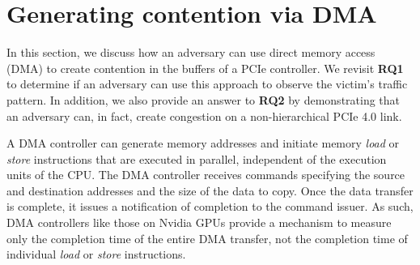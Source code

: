 \section{Generating contention via DMA}
\label{sec:interconnect-sc-dma}

In this section, we discuss how an adversary can use direct memory access (DMA) to create contention in the buffers of a PCIe controller.
We revisit \textbf{RQ1} to determine if an adversary can use this approach to observe the victim's traffic pattern. 
In addition, we also provide an answer to \textbf{RQ2} by demonstrating that an adversary can, in fact, create congestion on a non-hierarchical PCIe 4.0 link.

A DMA controller can generate memory addresses and initiate memory \textit{load} or \textit{store} instructions that are executed in parallel, independent of the execution units of the CPU.
The DMA controller receives commands specifying the source and destination addresses and the size of the data to copy.
Once the data transfer is complete, it issues a notification of completion to the command issuer.
As such, DMA controllers like those on Nvidia GPUs provide a mechanism to measure only the completion time of the entire DMA transfer, not the completion time of individual \textit{load} or \textit{store} instructions.


